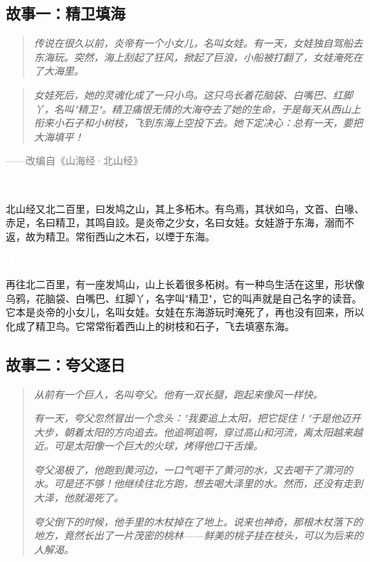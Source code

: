 \documentclass[a4paper,12pt]{ctexart}
\newcommand{\sidebox}[2]{%
  \noindent
  \begin{minipage}[t]{0.48\textwidth}
  \colorbox{blue!70!black}{\textcolor{white}{\normalsize\textbf{\hspace{0.3cm}原文\hspace{0.3cm}}}}
  \vspace{0.1cm}
  \par #1
  \end{minipage}
  \hfill
  \begin{minipage}[t]{0.48\textwidth}
  \colorbox{green!60!black}{\textcolor{white}{\normalsize\textbf{\hspace{0.3cm}译文\hspace{0.3cm}}}}
  \vspace{0.1cm}
  \par #2
  \end{minipage}
  \par
}
\begin{document}
\subsection*{\textcolor{teal!80!black}{故事一：精卫填海}}

\begin{quote}
\textit{传说在很久以前，炎帝有一个小女儿，名叫女娃。有一天，女娃独自驾船去东海玩。突然，海上刮起了狂风，掀起了巨浪，小船被打翻了，女娃淹死在了大海里。}
\end{quote}

\begin{quote}
\textit{女娃死后，她的灵魂化成了一只小鸟。这只鸟长着花脑袋、白嘴巴、红脚丫，名叫"精卫"。精卫痛恨无情的大海夺去了她的生命，于是每天从西山上衔来小石子和小树枝，飞到东海上空投下去。她下定决心：总有一天，要把大海填平！}
\end{quote}

\vspace{0.2cm}
\begin{center}
\textcolor{gray}{——改编自《山海经·北山经》}
\end{center}

\vspace{0.3cm}

\sidebox{
北山经又北二百里，曰发鸠之山，其上多柘木。有鸟焉，其状如乌，文首、白喙、赤足，名曰精卫，其鸣自詨。是炎帝之少女，名曰女娃。女娃游于东海，溺而不返，故为精卫。常衔西山之木石，以堙于东海。
}{ 
再往北二百里，有一座发鸠山，山上长着很多柘树。有一种鸟生活在这里，形状像乌鸦，花脑袋、白嘴巴、红脚丫，名字叫"精卫"，它的叫声就是自己名字的读音。它本是炎帝的小女儿，名叫女娃。女娃在东海游玩时淹死了，再也没有回来，所以化成了精卫鸟。它常常衔着西山上的树枝和石子，飞去填塞东海。
}

\vspace{0.3cm}

\subsection*{\textcolor{teal!80!black}{故事二：夸父逐日}}

\begin{quote}
\textit{从前有一个巨人，名叫夸父。他有一双长腿，跑起来像风一样快。}

\textit{有一天，夸父忽然冒出一个念头："我要追上太阳，把它捉住！"于是他迈开大步，朝着太阳的方向追去。他追啊追啊，穿过高山和河流，离太阳越来越近。可是太阳像一个巨大的火球，烤得他口干舌燥。}

\textit{夸父渴极了，他跑到黄河边，一口气喝干了黄河的水，又去喝干了渭河的水。可是还不够！他继续往北方跑，想去喝大泽里的水。然而，还没有走到大泽，他就渴死了。}

\textit{夸父倒下的时候，他手里的木杖掉在了地上。说来也神奇，那根木杖落下的地方，竟然长出了一片茂密的桃林——鲜美的桃子挂在枝头，可以为后来的人解渴。}
\end{quote}
\end{document}
